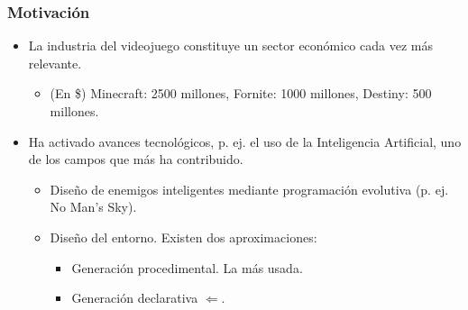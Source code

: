 \begin{frame}
	\frametitle{Motivación}

	\begin{itemize}
		\item<1-> La \textcolor{UDCpink}{industria del videojuego} constituye un sector económico cada vez más relevante.
		
		\vspace{0.5em}
		
		\begin{itemize}
			\item<2-> (En \$) Minecraft: 2500 millones, Fornite: 1000 millones, Destiny: 500 millones.
		\end{itemize}
	
		\vspace{1em}
		
		\item<3-> Ha activado avances tecnológicos, p. ej. el uso de la {Inteligencia Artificial}, uno de los campos que más ha contribuido.
		
		\vspace{0.5em}
		
		\begin{itemize}
			\item<4-> Diseño de enemigos inteligentes mediante programación evolutiva (p. ej. No Man's Sky).
			
			\vspace{0.5em}
			
			\item<5-> \textcolor{UDCpink}{Diseño del entorno}. Existen dos aproximaciones:
			
			\vspace{0.5em}
			
			\begin{itemize}
				\item<5-> Generación procedimental. La más usada.
				
				\vspace{0.5em}
				
				\item<7-> \textcolor{UDCpink}{Generación declarativa} $\Leftarrow$.
			\end{itemize}
		\end{itemize}
	\end{itemize}
\end{frame}

